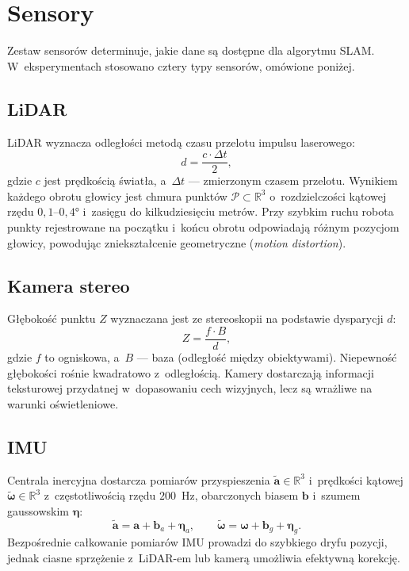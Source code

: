\section{Sensory}

Zestaw sensorów determinuje, jakie dane są dostępne dla algorytmu SLAM.
W~eksperymentach stosowano cztery typy sensorów, omówione poniżej.

\subsection{LiDAR}

LiDAR wyznacza odległości metodą czasu przelotu impulsu laserowego:
\begin{equation}
    d = \frac{c \cdot \Delta t}{2},
\end{equation}
gdzie $c$ jest prędkością światła, a~$\Delta t$ --- zmierzonym czasem
przelotu.
Wynikiem każdego obrotu głowicy jest chmura punktów $\mathcal{P} \subset \mathbb{R}^3$
o~rozdzielczości kątowej rzędu $0{,}1$--$0{,}4°$ i~zasięgu do kilkudziesięciu metrów.
Przy szybkim ruchu robota punkty rejestrowane na początku i~końcu obrotu
odpowiadają różnym pozycjom głowicy, powodując zniekształcenie geometryczne
(\textit{motion distortion}).

\subsection{Kamera stereo}

Głębokość punktu $Z$ wyznaczana jest ze stereoskopii na podstawie dysparycji $d$:
\begin{equation}
    Z = \frac{f \cdot B}{d},
\end{equation}
gdzie $f$ to ogniskowa, a~$B$ --- baza (odległość między obiektywami).
Niepewność głębokości rośnie kwadratowo z~odległością.
Kamery dostarczają informacji teksturowej przydatnej w~dopasowaniu cech wizyjnych,
lecz są wrażliwe na warunki oświetleniowe.

\subsection{IMU}

Centrala inercyjna dostarcza pomiarów przyspieszenia $\tilde{\mathbf{a}} \in \mathbb{R}^3$
i~prędkości kątowej $\tilde{\boldsymbol{\omega}} \in \mathbb{R}^3$ z~częstotliwością
rzędu $200$~Hz, obarczonych biasem $\mathbf{b}$ i~szumem gaussowskim $\boldsymbol{\eta}$:
\begin{equation}
    \tilde{\mathbf{a}} = \mathbf{a} + \mathbf{b}_a + \boldsymbol{\eta}_a, \qquad
    \tilde{\boldsymbol{\omega}} = \boldsymbol{\omega} + \mathbf{b}_g + \boldsymbol{\eta}_g.
\end{equation}
Bezpośrednie całkowanie pomiarów IMU prowadzi do szybkiego dryfu pozycji,
jednak ciasne sprzężenie z~LiDAR-em lub kamerą umożliwia efektywną korekcję.

